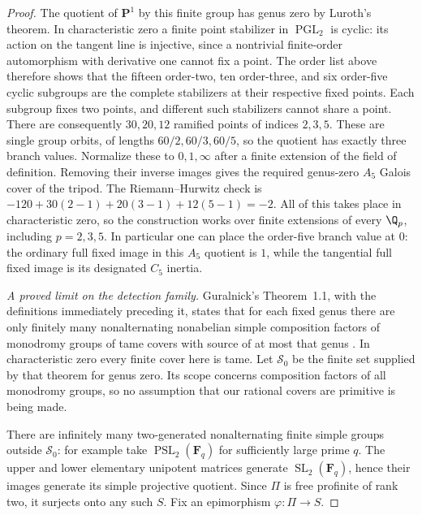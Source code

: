 \begin{proof}
The quotient of $\mathbf P^1$ by this finite group has genus zero
by Luroth's theorem. In characteristic zero a finite point stabilizer
in $\operatorname{PGL}_2$ is cyclic: its action on the tangent line
is injective, since a nontrivial finite-order automorphism with
derivative one cannot fix a point. The order list above therefore
shows that the fifteen order-two, ten order-three, and six order-five
cyclic subgroups are the complete stabilizers at their respective
fixed points. Each subgroup fixes two points, and different such
stabilizers cannot share a point. There are consequently $30,20,12$
ramified points of indices $2,3,5$. These are single group orbits,
of lengths $60/2,60/3,60/5$, so the quotient has exactly three
branch values. Normalize these to $0,1,\infty$ after a finite
extension of the field of definition. Removing their inverse images
gives the required genus-zero $A_5$ Galois cover of the tripod.
The Riemann--Hurwitz check is
$-120+30(2-1)+20(3-1)+12(5-1)=-2$.
All of this takes place in characteristic zero, so the construction
works over finite extensions of every $\Q_p$, including $p=2,3,5$.
In particular one can place the order-five branch value at $0$:
the ordinary full fixed image in this $A_5$ quotient is $1$,
while the tangential full fixed image is its designated $C_5$ inertia.

\emph{A proved limit on the detection family.}
Guralnick's Theorem~1.1, with the definitions immediately preceding it,
states that for each fixed genus there are only finitely many
nonalternating nonabelian simple composition factors of monodromy
groups of tame covers with source of at most that genus
\cite[pp.~2--3, Theorem~1.1]{BC_Guralnick2003}.
In characteristic zero every finite cover here is tame. Let
$\mathcal S_0$ be the finite set supplied by that theorem for genus zero.
Its scope concerns composition factors of all monodromy groups, so
no assumption that our rational covers are primitive is being made.

There are infinitely many two-generated nonalternating finite simple
groups outside $\mathcal S_0$: for example take
$\operatorname{PSL}_2(\mathbf F_q)$ for sufficiently large prime $q$.
The upper and lower elementary unipotent matrices generate
$\operatorname{SL}_2(\mathbf F_q)$, hence their images generate its
simple projective quotient. Since $\Pi$ is free profinite of rank two,
it surjects onto any such $S$. Fix an epimorphism $\varphi:\Pi\to S$.


\end{proof}
